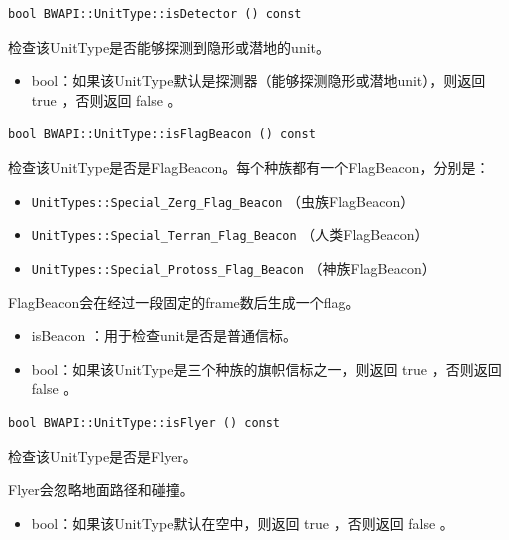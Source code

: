 \begin{tcolorbox}[colback=white, colframe=black!60!white, title=isDetector(), arc=0mm]
    \begin{verbatim}
bool BWAPI::UnitType::isDetector () const
    \end{verbatim}
    检查该UnitType是否能够探测到隐形或潜地的unit。
\begin{return}
\begin{itemize}
    \item bool：如果该UnitType默认是探测器（能够探测隐形或潜地unit），则返回   true  ，否则返回   false  。
\end{itemize}
\end{return}
\end{tcolorbox}


\begin{tcolorbox}[colback=white, colframe=black!60!white, title=isFlagBeacon(), arc=0mm]
    \begin{verbatim}
bool BWAPI::UnitType::isFlagBeacon () const
    \end{verbatim}
    检查该UnitType是否是FlagBeacon。每个种族都有一个FlagBeacon，分别是：
    \begin{itemize}
        \item \verb|UnitTypes::Special_Zerg_Flag_Beacon|  （虫族FlagBeacon）
        \item \verb|UnitTypes::Special_Terran_Flag_Beacon|  （人类FlagBeacon）
        \item \verb|UnitTypes::Special_Protoss_Flag_Beacon|  （神族FlagBeacon）
    \end{itemize}
    FlagBeacon会在经过一段固定的frame数后生成一个flag。
\begin{refer}
    \begin{itemize}
        \item isBeacon  ：用于检查unit是否是普通信标。
    \end{itemize}
\end{refer}
\begin{return}
\begin{itemize}
    \item bool：如果该UnitType是三个种族的旗帜信标之一，则返回   true  ，否则返回   false  。
\end{itemize}
\end{return}
\end{tcolorbox}


\begin{tcolorbox}[colback=white, colframe=black!60!white, title=isFlyer(), arc=0mm]
    \begin{verbatim}
bool BWAPI::UnitType::isFlyer () const
    \end{verbatim}
    检查该UnitType是否是Flyer。\par Flyer会忽略地面路径和碰撞。
\begin{return}
\begin{itemize}
    \item bool：如果该UnitType默认在空中，则返回   true  ，否则返回   false  。
\end{itemize}
\end{return}
\end{tcolorbox}


